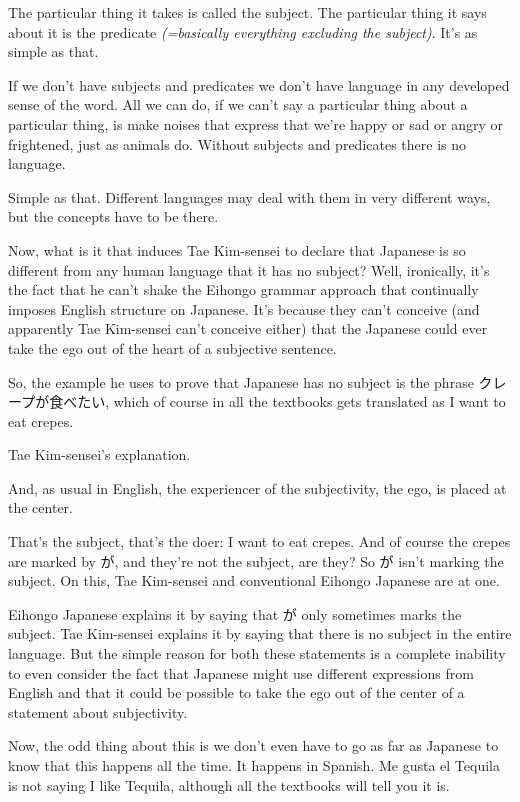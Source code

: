The particular thing it takes is called the subject. The particular thing it says about it is the predicate {\em (=basically everything excluding the subject)}. It's as simple as that.

If we don't have subjects and predicates we don't have language in any developed sense of the word. All we can do, if we can't say a particular thing about a particular thing, is make noises that express that we're happy or sad or angry or frightened, just as animals do. Without subjects and predicates there is no language.

Simple as that. Different languages may deal with them in very different ways, but the concepts have to be there.

\thinrule

Now, what is it that induces Tae Kim-sensei to declare that Japanese is so different from any human language that it has no subject? Well, ironically, it's the fact that he can't shake the Eihongo grammar approach that continually imposes English structure on Japanese. It's because they can't conceive (and apparently Tae Kim-sensei can't conceive either) that the Japanese could ever take the ego out of the heart of a subjective sentence.

So, the example he uses to prove that Japanese has no subject is the phrase クレープが食べたい, which of course in all the textbooks gets translated as I want to eat crepes.

{}

Tae Kim-sensei's explanation.

And, as usual in English, the experiencer of the subjectivity, the ego, is placed at the center.

That's the subject, that's the doer: I want to eat crepes. And of course the crepes are marked by が, and they're not the subject, are they? So が isn't marking the subject. On this, Tae Kim-sensei and conventional Eihongo Japanese are at one.

Eihongo Japanese explains it by saying that が only sometimes marks the subject. Tae Kim-sensei explains it by saying that there is no subject in the entire language. But the simple reason for both these statements is a complete inability to even consider the fact that Japanese might use different expressions from English and that it could be possible to take the ego out of the center of a statement about subjectivity.

Now, the odd thing about this is we don't even have to go as far as Japanese to know that this happens all the time. It happens in Spanish. Me gusta el Tequila is not saying I like Tequila, although all the textbooks will tell you it is.

